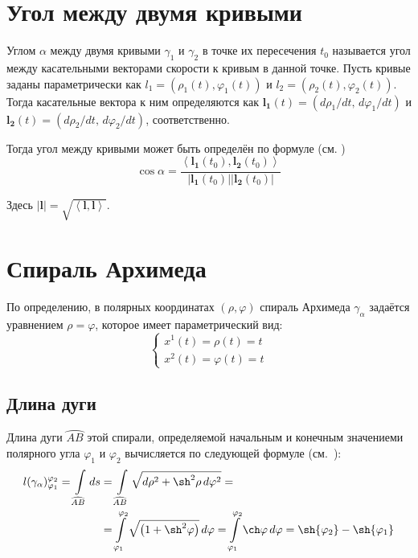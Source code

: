 \documentclass{article}
\numberwithin{equation}{section}
\renewcommand{\phi}{\varphi}
\newcommand{\scalmult}[2]{{\left \langle #1 \right \rangle}_{#2}}
\renewcommand{\vec}{\mathbf}
\providecommand{\arc}[1]{\wideparen{#1}}
\providecommand{\abs}[1]{\left \lvert{#1}\right \rvert}
\begin{document}
\section{Угол между двумя кривыми}

Углом $\alpha$ между двумя кривыми $\gamma_1$ и $\gamma_2$ в точке их
пересечения $t_0$ называется угол между касательными векторами
скорости к кривым в данной точке. Пусть кривые заданы параметрически
как $l_1 = (\rho_1(t), \phi_1(t))$ и $l_2 = (\rho_2(t), \phi_2(t))$.
Тогда касательные вектора к ним определяются как $\vec{l_1}(t) =
(d\rho_1/dt,\,d\phi_1/dt)$ и $\vec{l_2}(t) =
(d\rho_2/dt,\,d{\phi_2}/dt)$, соответственно.

Тогда угол между
кривыми может быть определён по формуле (см. \cite{dubrovin98})
\begin{equation}\label{eq:curves-angle}
  \cos \alpha = \frac{\scalmult{\vec{l_1}(t_0), \vec{l_2}(t_0)}{}}{\abs{\vec{l_1}(t_0)} \abs{\vec{l_2}(t_0)}}
\end{equation}

Здесь $\abs{\vec{l}} = \sqrt{\scalmult{\vec{l},\vec{l}}{}}$.

\clearpage

\section{Спираль Архимеда}

По определению, в полярных координатах $(\rho, \phi)$ спираль Архимеда
$\gamma_\alpha$ задаётся уравнением $\rho = \phi$, которое имеет
параметрический вид:
\begin{equation}\label{eq:arch-spiral}
  \begin{cases}
    x^1(t) = \rho(t) = t \\
    x^2(t) = \phi(t) = t
  \end{cases}
\end{equation}

\subsection{Длина дуги}

Длина дуги $\arc{AB}$ этой спирали, определяемой начальным и конечным значениеми
полярного угла $\phi_1$ и $\phi_2$ вычисляется по следующей формуле
(см. \cite{dubrovin98}):
\begin{equation}\label{eq:arch-length}
  \begin{split}
    l(\gamma_\alpha)^{\phi_2}_{\phi_1} =
    \int \limits_{\arc{AB}}{ds} &=
    \int \limits_{\arc{AB}}{\sqrt{d\rho^2+\sh^2\rho\,d\phi^2}} =\\
    &=\int \limits^{\phi_2}_{\phi_1}{\sqrt{\left ( 1 + \sh^2\phi \right )}}\,d\phi =
    \int \limits^{\phi_2}_{\phi_1}\ch\phi\,d\phi =
    \sh{\phi_2} - \sh{\phi_1}
  \end{split}
\end{equation}
\end{document}
